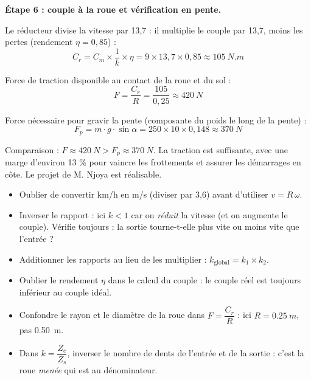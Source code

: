 \documentclass[11pt]{article}
\newcounter{popsec}
\newcounter{popsub}
\newcommand{\courssub}[1]{%
  \stepcounter{popsub}%
  \par\vspace{9pt}\noindent{\popxbold\fontsize{11.5}{13}\selectfont\color{popink}{\color{poporange}\thepopsec.\thepopsub}\hspace{6pt}#1}\par\nopagebreak\vspace{4pt}
}
\begin{document}
\begin{exoresolu}
\textbf{Étape 6 : couple à la roue et vérification en pente.}

Le réducteur divise la vitesse par 13,7 : il multiplie le couple par 13,7, moins les pertes (rendement $\eta = 0,85$) :
\[
C_r = C_m \times \frac{1}{k} \times \eta = 9 \times 13,7 \times 0,85 \approx \SI{105}{N.m}
\]

Force de traction disponible au contact de la roue et du sol :
\[
F = \frac{C_r}{R} = \frac{105}{0,25} \approx \SI{420}{N}
\]

Force nécessaire pour gravir la pente (composante du poids le long de la pente) :
\[
F_p = m \cdot g \cdot \sin\alpha = 250 \times 10 \times 0,148 \approx \SI{370}{N}
\]

Comparaison : $F \approx \SI{420}{N} > F_p \approx \SI{370}{N}$. La traction est suffisante, avec une marge d'environ 13 \% pour vaincre les frottements et assurer les démarrages en côte. Le projet de M. Njoya est réalisable.
\end{exoresolu}

\begin{attention}
\begin{itemize}
\item Oublier de convertir km/h en m/s (diviser par 3,6) avant d'utiliser $v = R\,\omega$.
\item Inverser le rapport : ici $k < 1$ car on \emph{réduit} la vitesse (et on augmente le couple). Vérifie toujours : la sortie tourne-t-elle plus vite ou moins vite que l'entrée ?
\item Additionner les rapports au lieu de les multiplier : $k_{\text{global}} = k_1 \times k_2$.
\item Oublier le rendement $\eta$ dans le calcul du couple : le couple réel est toujours inférieur au couple idéal.
\item Confondre le rayon et le diamètre de la roue dans $F = \dfrac{C_r}{R}$ : ici $R = \SI{0,25}{m}$, pas \SI{0,50}{m}.
\item Dans $k = \dfrac{Z_e}{Z_s}$, inverser le nombre de dents de l'entrée et de la sortie : c'est la roue \emph{menée} qui est au dénominateur.
\end{itemize}
\end{attention}

\courssub{Bilan de l'activité}
\end{document}
